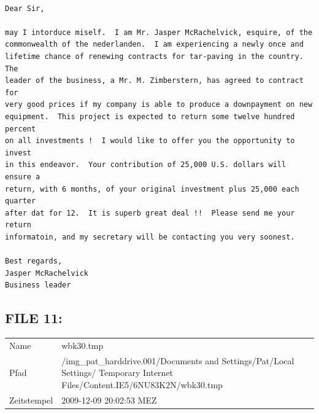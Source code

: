 \begin{lstlisting}

Dear Sir,

may I intorduce miself.  I am Mr. Jasper McRachelvick, esquire, of the 
commonwealth of the nederlanden.  I am experiencing a newly once and 
lifetime chance of renewing contracts for tar-paving in the country.  The 
leader of the business, a Mr. M. Zimberstern, has agreed to contract for 
very good prices if my company is able to produce a downpayment on new 
equipment.  This project is expected to return some twelve hundred percent 
on all investments !  I would like to offer you the opportunity to invest 
in this endeavor.  Your contribution of 25,000 U.S. dollars will ensure a 
return, with 6 months, of your original investment plus 25,000 each quarter 
after dat for 12.  It is superb great deal !!  Please send me your return 
informatoin, and my secretary will be contacting you very soonest.

Best regards,
Jasper McRachelvick
Business leader

\end{lstlisting}

\subsection{FILE 11:}
\label{sec:pat_emails_11}	

\begin{table}[htb]
	\begin{tabular}{p{2cm} p{13.5cm}}
		Name & wbk30.tmp\\
		Pfad & /img_pat_harddrive.001/Documents and Settings/Pat/Local Settings/ Temporary Internet Files/Content.IE5/6NU83K2N/wbk30.tmp\\
		Zeitstempel & 2009-12-09 20:02:53 MEZ
	\end{tabular}
\end{table}	

